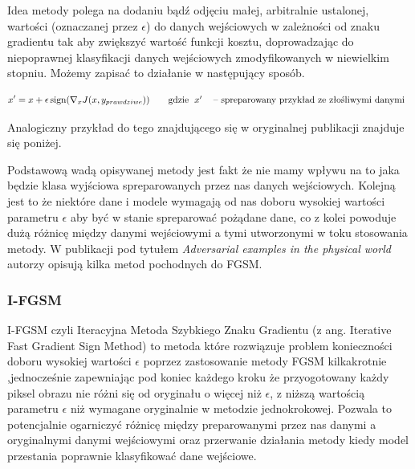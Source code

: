 \documentclass[
    left=2.5cm,         %
    right=2.5cm,        %
    top=2.5cm,          %
    bottom=3cm,         %
    bindingoffset=6mm,  %
    nohyphenation=false %
]{eiti/eiti-thesis}
\begin{document}
    Idea metody polega na dodaniu bądź odjęciu małej, arbitralnie ustalonej, wartości (oznaczanej przez \(\epsilon\)) do
    danych wejściowych w zależności od znaku gradientu tak aby zwiększyć wartość funkcji kosztu,
    doprowadzając do niepoprawnej klasyfikacji danych wejściowych zmodyfikowanych w niewielkim stopniu.
    Możemy zapisać to działanie w następujący sposób.

    \begin{equation}
    x' = x + \epsilon\operatorname{sign}(\nabla_{x} J(x, y_{prawdziwe}))
    \qquad\text{gdzie}
    \begin{tabular}[t]{ll}
    $x'$  & -- spreparowany przykład ze złośliwymi danymi \\
    \end{tabular}
    \end{equation}

    Analogiczny przykład do tego znajdującego się w oryginalnej publikacji\cite{harnessing} znajduje się poniżej.

    Podstawową wadą opisywanej metody jest fakt że nie mamy wpływu na to jaka będzie klasa wyjściowa
    spreparowanych przez nas danych wejściowych. Kolejną jest to że niektóre dane i modele wymagają od nas
    doboru wysokiej wartości parametru $\epsilon$ aby być w stanie spreparować pożądane dane, co z kolei powoduje dużą
    różnicę między danymi wejściowymi a tymi utworzonymi w toku stosowania metody.
    W publikacji pod tytułem \textit{Adversarial examples in the physical world}\cite{DBLP:journals/corr/KurakinGB16}
    autorzy opisują kilka metod pochodnych do FGSM.

    \subsubsection{I-FGSM}
    I-FGSM czyli Iteracyjna Metoda Szybkiego Znaku Gradientu (z ang. Iterative Fast Gradient Sign Method) to metoda
    które rozwiązuje problem konieczności doboru wysokiej wartości $\epsilon$ poprzez zastosowanie metody FGSM kilkakrotnie
    ,jednocześnie zapewniając pod koniec każdego kroku że przyogotowany każdy piksel obrazu nie różni się od oryginału o więcej
    niż $\epsilon$, z niższą wartością parametru $\epsilon$ niż wymagane oryginalnie w metodzie jednokrokowej.
    Pozwala to  potencjalnie ogarniczyć różnicę między preparowanymi przez nas danymi a oryginalnymi danymi wejściowymi
    oraz przerwanie działania metody kiedy model przestania poprawnie klasyfikować dane wejściowe.
\end{document}
